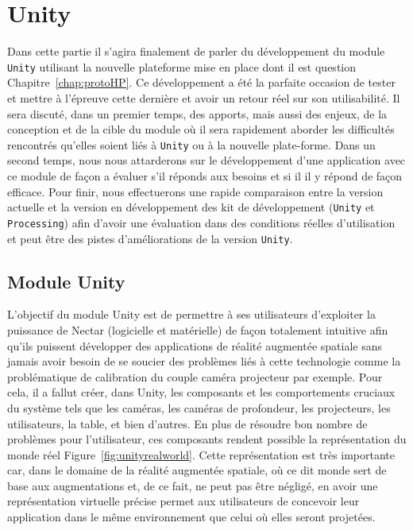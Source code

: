 \chapter{Unity}

Dans cette partie il s'agira finalement de parler du développement du module \texttt{Unity} utilisant la nouvelle plateforme mise en place dont il est question Chapitre~\ref{chap:protoHP}. Ce développement a été la parfaite occasion de tester et mettre à l'épreuve cette dernière et avoir un retour réel sur son utilisabilité.
Il sera discuté, dans un premier temps, des apports, mais aussi des enjeux, de la conception et de la cible du module où il sera rapidement aborder les difficultés rencontrés qu'elles soient liés à \texttt{Unity} ou à la nouvelle plate-forme. 
Dans un second temps, nous nous attarderons sur le développement d'une application avec ce module de façon a évaluer s'il réponds aux besoins et si il il y répond de façon efficace.
Pour finir, nous effectuerons une rapide comparaison entre la version actuelle et la version en développement des kit de développement (\texttt{Unity} et \texttt{Processing}) afin d'avoir une évaluation dans des conditions réelles d'utilisation et peut être des pistes d'améliorations de la version \texttt{Unity}.

\section{Module Unity}

L'objectif du module Unity est de permettre à ses utilisateurs d'exploiter la puissance de Nectar (logicielle et matérielle) de façon totalement intuitive afin qu'ils puissent développer des applications de réalité augmentée spatiale sans jamais avoir besoin de se soucier des problèmes liés à cette technologie comme la problématique de calibration du couple caméra projecteur par exemple.
Pour cela, il a fallut créer, dans Unity, les composants et les comportements cruciaux du système tels que les caméras, les caméras de profondeur, les projecteurs, les utilisateurs, la table, et bien d'autres. En plus de résoudre bon nombre de problèmes pour l'utilisateur, ces composants rendent possible la représentation du monde réel Figure~\ref{fig:unityrealworld}. Cette représentation est très importante car, dans le domaine de la réalité augmentée spatiale, où ce dit monde sert de base aux augmentations et, de ce fait, ne peut pas être négligé, en avoir une représentation virtuelle précise permet aux utilisateurs de concevoir leur application dans le même environnement que celui où elles seront projetées.

